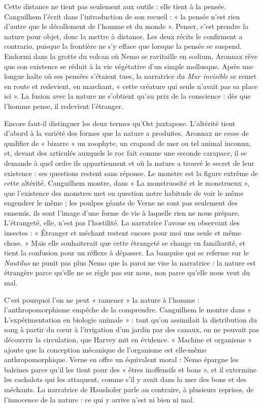 \documentclass[11pt,a4paper]{article}
\begin{document}
Cette distance ne tient pas seulement aux outils : elle tient à la pensée. Canguilhem l'écrit dans l'introduction de son recueil : « la pensée n'est rien d'autre que le décollement de l'homme et du monde ». Penser, c'est prendre la nature pour objet, donc la mettre à distance. Les deux récits le confirment a contrario, puisque la frontière ne s'y efface que lorsque la pensée se suspend. Endormi dans la grotte du volcan où Nemo se ravitaille en sodium, Aronnax rêve que son existence se réduit à la vie végétative d'un simple mollusque. Après une longue halte où ses pensées s'étaient tues, la narratrice du \emph{Mur invisible} se remet en route et redevient, en marchant, « cette créature qui seule n'avait pas sa place ici ». La fusion avec la nature ne s'obtient qu'au prix de la conscience : dès que l'homme pense, il redevient l'étranger.

Encore faut-il distinguer les deux termes qu'Ost juxtapose. L'altérité tient d'abord à la variété des formes que la nature a produites. Aronnax ne cesse de qualifier de « bizarre » un zoophyte, un crapaud de mer ou tel animal inconnu, et, devant des articulés auxquels le roc fait comme une seconde carapace, il se demande à quel ordre ils appartiennent et où la nature a trouvé le secret de leur existence : ses questions restent sans réponse. Le monstre est la figure extrême de cette altérité. Canguilhem montre, dans « La monstruosité et le monstrueux », que l'existence des monstres met en question notre habitude de voir le même engendrer le même ; les poulpes géants de Verne ne sont pas seulement des ennemis, ils sont l'image d'une forme de vie à laquelle rien ne nous prépare. L'étrangeté, elle, n'est pas l'hostilité. La narratrice l'avoue en observant des insectes : « Étranger et méchant restent encore pour moi une seule et même chose. » Mais elle souhaiterait que cette étrangeté se change en familiarité, et tient la confusion pour un réflexe à dépasser. La banquise qui se referme sur le \emph{Nautilus} ne punit pas plus Nemo que la paroi ne vise la narratrice : la nature est étrangère parce qu'elle ne se règle pas sur nous, non parce qu'elle nous veut du mal.

C'est pourquoi l'on ne peut « ramener » la nature à l'homme : l'anthropomorphisme empêche de la comprendre. Canguilhem le montre dans « L'expérimentation en biologie animale » : tant qu'on assimilait la distribution du sang à partir du cœur à l'irrigation d'un jardin par des canaux, on ne pouvait pas découvrir la circulation, que Harvey mit en évidence. « Machine et organisme » ajoute que la conception mécanique de l'organisme est elle-même anthropomorphique. Verne en offre un équivalent moral : Nemo épargne les baleines parce qu'il les tient pour des « êtres inoffensifs et bons », et il extermine les cachalots qui les attaquent, comme s'il y avait dans la mer des bons et des méchants. La narratrice de Haushofer parle au contraire, à plusieurs reprises, de l'innocence de la nature : ce qui y arrive n'est ni bien ni mal.
\end{document}
